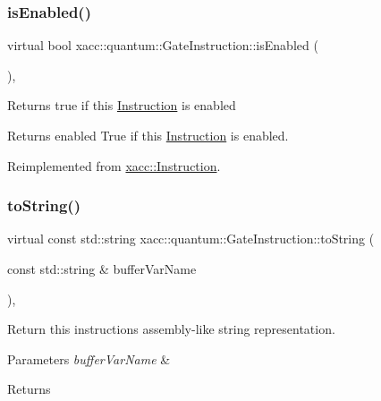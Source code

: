 \mbox{\label{a01276_a0a821be322b0c848b01c55f91fc8f484}} 
\subsubsection{\texorpdfstring{is\+Enabled()}{isEnabled()}}
{\footnotesize\ttfamily virtual bool xacc\+::quantum\+::\+Gate\+Instruction\+::is\+Enabled (\begin{DoxyParamCaption}{ }\end{DoxyParamCaption})\hspace{0.3cm}{\ttfamily [inline]}, {\ttfamily [virtual]}}

Returns true if this \hyperlink{a02460}{Instruction} is enabled

\begin{DoxyReturn}{Returns}
enabled True if this \hyperlink{a02460}{Instruction} is enabled. 
\end{DoxyReturn}


Reimplemented from \hyperlink{a02460_ad02a1cf7220577124720b7a51424cea7}{xacc\+::\+Instruction}.

\mbox{\label{a01276_a089a5da67ff40ac1a6f56e64589822d9}} 
\subsubsection{\texorpdfstring{to\+String()}{toString()}}
{\footnotesize\ttfamily virtual const std\+::string xacc\+::quantum\+::\+Gate\+Instruction\+::to\+String (\begin{DoxyParamCaption}\item[{const std\+::string \&}]{buffer\+Var\+Name }\end{DoxyParamCaption})\hspace{0.3cm}{\ttfamily [inline]}, {\ttfamily [virtual]}}

Return this instruction\textquotesingle{}s assembly-\/like string representation. 
\begin{DoxyParams}{Parameters}
{\em buffer\+Var\+Name} & \\
\hline
\end{DoxyParams}
\begin{DoxyReturn}{Returns}

\end{DoxyReturn}


